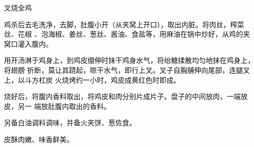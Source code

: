 \begin{recipe}{叉烧全鸡}

\ingredients


\cooking

鸡杀后去毛洗净，去脚，肚腹小开（从夹窝上开口），取出内脏。将肉丝，榨菜丝、花椒
、泡海椒、姜丝、葱丝、酱油、食盐等，用麻油在锅中炒好，从鸡的夹窝口灌入腹内。

用开汤淋于鸡身上，到鸡皮绷伸时抹干鸡身水气，将绐糖揉散均匀地抹在鸡身上，将翅膀
折断，莫让其跷起，晾干水气，即行上叉。叉子自胸脯伸向尾部，连腿叉上，以斗方杠炭
火烧烤约一小时，鸡皮成黄红色时即成。

烧好后，将腹内香料取出，将鸡皮和肉分别片成片子。盘子的中间放肉，一端放皮，另一
端放肚腹内取出的香料。

另备白油调料调味，并备火夹饼、葱佐食。

\notes

皮酥肉嫩、味香鲜美。

\end{recipe}


